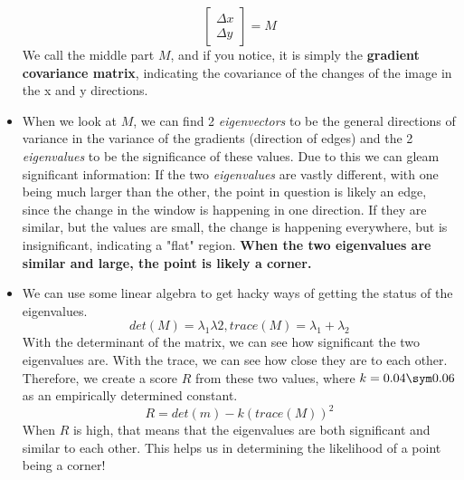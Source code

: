\documentclass{article}
\begin{document}
\begin{itemize}
$$\begin{bmatrix}
    \Delta x \\
    \Delta y
    \end{bmatrix} = M
    $$
    We call the middle part $M$, and if you notice, it is simply the \textbf{gradient covariance matrix}, indicating the covariance of the changes of the image in the x and y directions.
    \item When we look at $M$, we can find 2 \textit{eigenvectors} to be the general directions of variance in the variance of the gradients (direction of edges) and the 2 \textit{eigenvalues} to be the significance of these values. Due to this we can gleam significant information: If the two \textit{eigenvalues} are vastly different, with one being much larger than the other, the point in question is likely an edge, since the change in the window is happening in one direction. If they are similar, but the values are small, the change is happening everywhere, but is insignificant, indicating a "flat" region. \textbf{When the two eigenvalues are similar and large, the point is likely a corner.}
    \item We can use some linear algebra to get hacky ways of getting the status of the eigenvalues. 
    $$det(M) = \lambda_1\lambda2, trace(M) = \lambda_1 + \lambda_2$$
    With the determinant of the matrix, we can see how significant the two eigenvalues are. With the trace, we can see how close they are to each other. Therefore, we create a score $R$ from these two values, where $k = 0.04 \sym 0.06$ as an empirically determined constant.
    $$R = det(m) - k(trace(M))^2$$
    When $R$ is high, that means that the eigenvalues are both significant and similar to each other. This helps us in determining the likelihood of a point being a corner!
\end{itemize}
\end{document}
